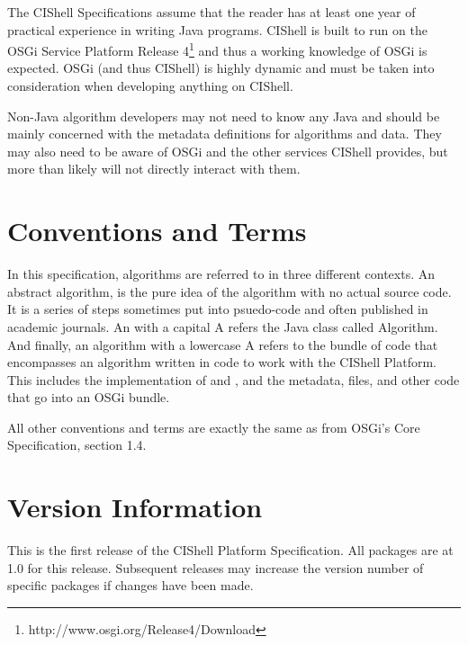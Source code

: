 The CIShell Specifications assume that the reader has at least one year of
practical experience in writing Java programs. CIShell is built to run on the
OSGi Service Platform Release 4\footnote{http://www.osgi.org/Release4/Download}
and thus a working knowledge of OSGi is expected. OSGi (and thus CIShell) is highly dynamic and must be taken into consideration
when developing anything on CIShell.

Non-Java algorithm developers may not need to know any Java and should be mainly
concerned with the metadata definitions for algorithms and data. They may also
need to be aware of OSGi and the other services CIShell provides, but more than
likely will not directly interact with them.

\section{Conventions and Terms}

In this specification, algorithms are referred to in three different contexts. An
abstract algorithm, is the pure idea of the algorithm with no actual source code.
It is a series of steps sometimes put into psuedo-code and often published in
academic journals. An  with a capital A refers the Java class
called Algorithm. And finally, an algorithm with a lowercase A refers to the
bundle of code that encompasses an algorithm written in code to work with the
CIShell Platform. This includes the implementation of 
and , and the metadata, files, and other code that go into an
OSGi bundle.

All other conventions and terms are exactly the same as from OSGi's Core
Specification, section 1.4.

\section{Version Information}

This is the first release of the CIShell Platform Specification. All packages are
at 1.0 for this release. Subsequent releases may increase the version number of
specific packages if changes have been made.

